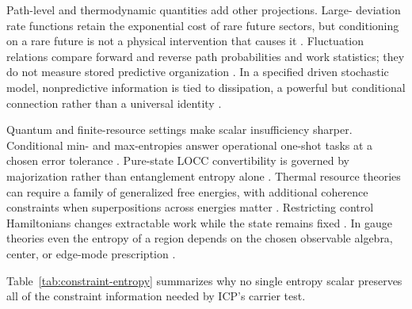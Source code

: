 Path-level and thermodynamic quantities add other projections.  Large-
deviation rate functions retain the exponential cost of rare future sectors,
but conditioning on a rare future is not a physical intervention that causes
it \citep{DonskerVaradhan1975MarkovExpectations,
ChetriteTouchette2015Conditioned}.  Fluctuation relations compare forward and
reverse path probabilities and work statistics; they do not measure stored
predictive organization \citep{Jarzynski1997Equality,
Crooks1999EntropyProduction,Seifert2005TrajectoryEntropy}.  In a specified
driven stochastic model, nonpredictive information is tied to dissipation, a
powerful but conditional connection rather than a universal identity
\citep{StillEtAl2012Prediction}.

Quantum and finite-resource settings make scalar insufficiency sharper.
Conditional min- and max-entropies answer operational one-shot tasks at a
chosen error tolerance \citep{KonigEtAl2009MinMax}.  Pure-state LOCC
convertibility is governed by majorization rather than entanglement entropy
alone \citep{Nielsen1999EntanglementTransformations}.  Thermal resource
theories can require a family of generalized free energies, with additional
coherence constraints when superpositions across energies matter
\citep{BrandaoEtAl2015SecondLaws,LostaglioEtAl2015Coherence}.  Restricting
control Hamiltonians changes extractable work while the state remains fixed
\citep{WilmingEtAl2016ControlRestrictions}.  In gauge theories even the entropy
of a region depends on the chosen observable algebra, center, or edge-mode
prescription \citep{Donnelly2012GaugeEntropy,CasiniEtAl2014GaugeFields}.

Table~\ref{tab:constraint-entropy} summarizes why no single entropy scalar
preserves all of the constraint information needed by ICP's carrier test.

